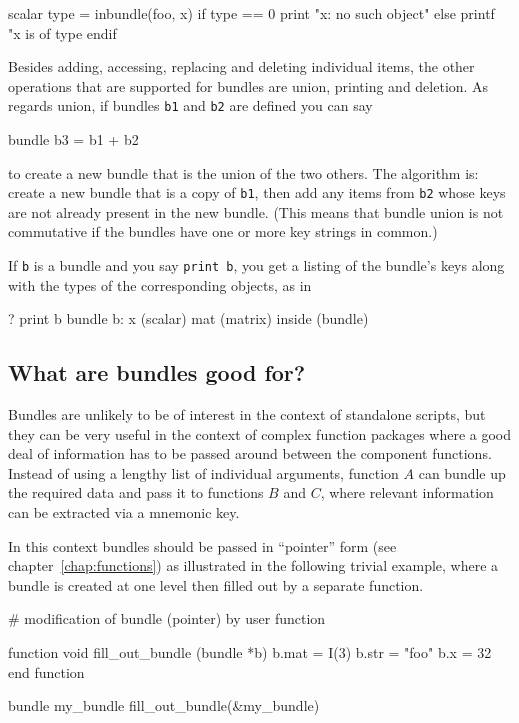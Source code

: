 \begin{code}
scalar type = inbundle(foo, x)
if type == 0
  print "x: no such object"
else
  printf "x is of type %
endif
\end{code}

Besides adding, accessing, replacing and deleting individual items,
the other operations that are supported for bundles are union,
printing and deletion. As regards union, if bundles \texttt{b1} and
\texttt{b2} are defined you can say

\begin{code}
bundle b3 = b1 + b2
\end{code}

to create a new bundle that is the union of the two others. The
algorithm is: create a new bundle that is a copy of \texttt{b1}, then
add any items from \texttt{b2} whose keys are not already present in
the new bundle. (This means that bundle union is not commutative if
the bundles have one or more key strings in common.)

If \texttt{b} is a bundle and you say \texttt{print b}, you get a
listing of the bundle's keys along with the types of the corresponding
objects, as in

\begin{code}
? print b
bundle b:
 x (scalar)
 mat (matrix)
 inside (bundle)
\end{code}

\subsection{What are bundles good for?}

Bundles are unlikely to be of interest in the context of standalone
 scripts, but they can be very useful in the context of
complex function packages where a good deal of information has to be
passed around between the component functions. Instead of using a
lengthy list of individual arguments, function $A$ can bundle up the
required data and pass it to functions $B$ and $C$, where relevant
information can be extracted via a mnemonic key.

In this context bundles should be passed in ``pointer'' form
(see chapter~\ref{chap:functions}) as illustrated in the following
trivial example, where a bundle is created at one level then filled
out by a separate function.

\begin{code}
# modification of bundle (pointer) by user function

function void fill_out_bundle (bundle *b)
  b.mat =  I(3)
  b.str = "foo"
  b.x = 32
end function

bundle my_bundle 
fill_out_bundle(&my_bundle)
\end{code}

